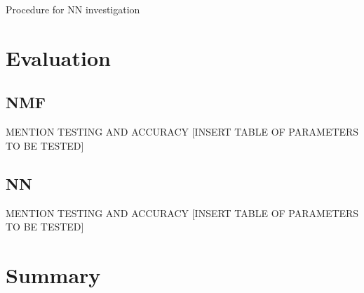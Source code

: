 \begin{algorithm}
    \AlgoFontSize
    \DontPrintSemicolon
    \BlankLine


    \BlankLine

    \vspace{.5em}
    \caption{Procedure for NN investigation}
    \label{system:algo:NN}
\end{algorithm}

\newpage
\section{Evaluation}
\subsection{NMF}
MENTION TESTING AND ACCURACY
    [INSERT TABLE OF PARAMETERS TO BE TESTED]
\subsection{NN}
MENTION TESTING AND ACCURACY
    [INSERT TABLE OF PARAMETERS TO BE TESTED]


\section{Summary}
